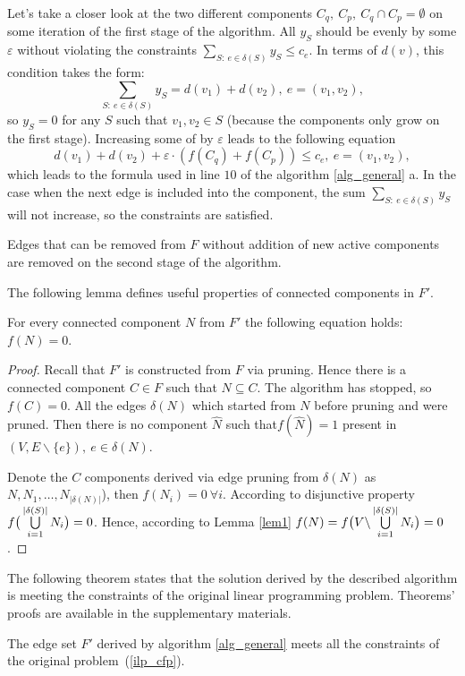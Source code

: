 \documentclass[11pt, tightenlines, twoside, onecolumn, nofloats, nobibnotes, nofootinbib, superscriptaddress, noshowpacks, centertags]{revtex4}
\begin{document}
Let's take a closer look at the two different components $C_q,~C_p,~C_q\cap C_p=\emptyset$ on some iteration of the first stage of the algorithm. All $y_S$ should be evenly by some $\varepsilon$ without violating the constraints $\sum\limits_ {S:~e\in \delta(S)}y_S\leqslant c_e$. In terms of $d(v)$, this condition takes the form:
$$\sum\limits_{S:~e\in \delta(S)}y_S = d(v_1)+d(v_2),~e=(v_1,v_2),$$
so $y_S=0$ for any $S$ such that $v_1, v_2\in S$ (because the components only grow on the first stage). Increasing some of by $\varepsilon$ leads to the following equation
$$d(v_1)+d(v_2)+\varepsilon\cdot (f(C_q)+f(C_p))\leqslant c_e,~e=(v_1,v_2),$$
which leads to the formula used in line $10$ of the algorithm \ref{alg_general} a. In the case when the next edge is included into the component, the sum $\sum\limits_{S:~e\in \delta (S)}y_S$ will not increase, so the constraints are satisfied.

Edges that can be removed from $F$ without addition of new active components are removed on the second stage of the algorithm.


The following lemma defines useful properties of connected components in $F'$.

\begin{lemma}
    For every connected component $N$ from $F'$ the following equation holds: $f(N)=0$.
    \label{lem2}
\end{lemma}
\begin{proof}
    Recall that $F'$ is constructed from $F$ via pruning. Hence there is a connected component $C\in F$ such that $N\subseteq C$. The algorithm has stopped, so $f(C) = 0$. All the edges $\delta(N)$ which started from $N$ before pruning and were pruned. Then there is no component $\hat{N}$ such that$f(\hat{N})=1$ present in $(V, E\backslash\{e\}),~e\in\delta(N)$. 
    
    Denote the $C$ components derived via edge pruning from $\delta(N)$ as $N,N_1,\ldots,N_{|\delta(N)|}$), then $f(N_i) = 0~\forall i$. According to disjunctive property $f\big(\bigcup\limits_{i=1}^{|\delta(S)|} N_i\big) = 0$. Hence, according to Lemma \ref{lem1}  $f(N) = f\big( V\backslash\bigcup\limits_{i=1}^{|\delta(S)|} N_i\big) = 0$.
\end{proof}

The following theorem states that the solution derived by the described algorithm is meeting the constraints of the original linear programming problem. Theorems' proofs are available in the supplementary materials.

\begin{theorem}
    The edge set $F'$ derived by algorithm \ref{alg_general} meets all the constraints of the original problem~(\ref{ilp_cfp}).
    \label{theorem1}
\end{theorem}
\end{document}
